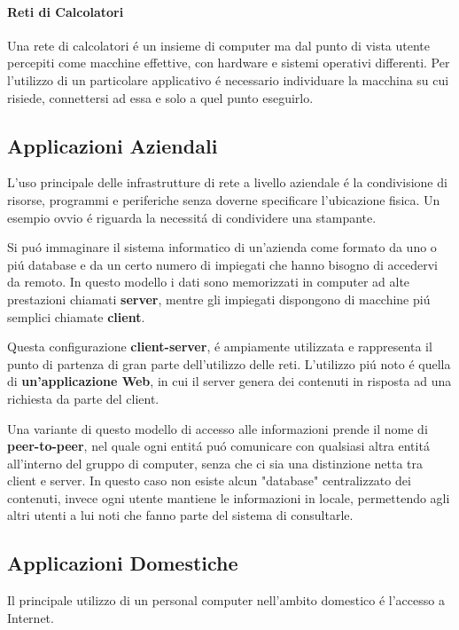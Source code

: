 \documentclass[12pt]{article}
\begin{document}
\paragraph{Reti di Calcolatori} Una rete di calcolatori \'e un insieme di computer ma dal punto di vista utente percepiti
come macchine effettive, con hardware e sistemi operativi differenti. Per l'utilizzo di un particolare applicativo \'e
necessario individuare la macchina su cui risiede, connettersi ad essa e solo a quel punto eseguirlo.

\clearpage
\subsection{Applicazioni Aziendali}\label{applicazioni-aziendali}
L'uso principale delle infrastrutture di rete a livello aziendale \'e la condivisione di risorse, programmi e periferiche 
senza doverne specificare l'ubicazione fisica. Un esempio ovvio \'e riguarda la necessit\'a di condividere una stampante.

Si pu\'o immaginare il sistema informatico di un'azienda come formato da uno o pi\'u database e da un certo numero di
impiegati che hanno bisogno di accedervi da remoto. In questo modello i dati sono memorizzati in computer ad alte
prestazioni chiamati \textbf{server}, mentre gli impiegati dispongono di macchine pi\'u semplici chiamate 
\textbf{client}.

Questa configurazione \textbf{client-server}, \'e ampiamente utilizzata e rappresenta il punto di partenza di 
gran parte dell'utilizzo delle reti. L'utilizzo pi\'u noto \'e quella di \textbf{un'applicazione Web}, in cui il 
server genera dei contenuti in risposta ad una richiesta da parte del client.

Una variante di questo modello di accesso alle informazioni prende il nome di \textbf{peer-to-peer}, nel quale ogni 
entit\'a pu\'o comunicare con qualsiasi altra entit\'a all'interno del gruppo di computer, senza che ci sia una 
distinzione netta tra client e server. In questo caso non esiste alcun "database" centralizzato dei contenuti, invece ogni 
utente mantiene le informazioni in locale, permettendo agli altri utenti a lui noti che fanno parte del sistema di consultarle.

\subsection{Applicazioni Domestiche}\label{applicazioni-domestiche}
Il principale utilizzo di un personal computer nell'ambito domestico \'e l'accesso a Internet.
\end{document}
